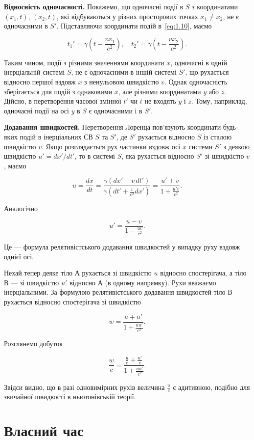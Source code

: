 \textbf{Відносність одночасності.} Покажемо, що одночасні події в $S$ з координатами $(x_1, t)$, $(x_2, t)$, які відбуваються у різних просторових точках $x_1 \neq x_2$, не є одночасними в $S'$. Підставляючи координати подій в~\eqref{eq:1.10}, маємо

\[
t_1' = \gamma \left(t - \frac{v x_1}{c^2}\right), \quad t_2' = \gamma \left(t - \frac{v x_2}{c^2}\right).
\]

Таким чином, події з різними значеннями координати $x$, одночасні в одній інерціальній системі $S$, не є одночасними в іншій системі $S'$, що рухається відносно першої вздовж $x$ з ненульовою швидкістю $v$. Однак одночасність зберігається для подій з однаковими $x$, але різними координатами $y$ або $z$. Дійсно, в перетворення часової змінної $t'$ чи $t$ не входять $y$ і $z$. Тому, наприклад, одночасні події на осі $y$ в $S$ є одночасними і в $S'$.

\textbf{Додавання швидкостей.} Перетворення Лоренца пов'язують координати будь-яких подій в інерціальних СВ $S$ та $S'$, де $S'$ рухається відносно $S$ із сталою швидкістю $v$. Якщо розглядається рух частинки вздовж осі $x$ системи $S'$ з деякою швидкістю $u' = dx'/dt'$, то в системі $S$, яка рухається відносно $S'$ зі швидкістю $v$, маємо

\[
u = \frac{dx}{dt} = \frac{\gamma (dx' + v \, dt')}{\gamma (dt' + \frac{v}{c^2} dx')} = \frac{u' + v}{1 + \frac{u' v}{c^2}}.
\]

Аналогічно

\[
u' = \frac{u - v}{1 - \frac{u v}{c^2}}.
\]

Це --- формула релятивістського додавання швидкостей у випадку руху вздовж однієї осі.

Нехай тепер деяке тіло А рухається зі швидкістю $u$ відносно спостерігача, а тіло В --- зі швидкістю $u'$ відносно А (в одному напрямку). Рухи вважаємо інерціальними. За формулою релятивістського додавання швидкостей тіло В рухається відносно спостерігача зі швидкістю

\[
w = \frac{u + u'}{1 + \frac{u u'}{c^2}}.
\]

Розглянемо добуток

\[
\frac{w}{c} = \frac{\frac{u}{c} + \frac{u'}{c}}{1 + \frac{u u'}{c^2}}.
\]

Звідси видно, що в разі одновимірних рухів величина $\frac{u}{c}$ є адитивною, подібно для звичайної швидкості в ньютонівській теорії.

\section{Власний час}

